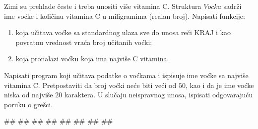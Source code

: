 
\begin{Exercise}[label=struc.2] 
 Zimi su prehlade česte i treba unositi više vitamina C. Struktura
 $Vocka$ sadrži ime voćke i
 količinu vitamina C u miligramima (realan broj). Napisati funkcije:
\begin{enumerate}
  \item {} koja učitava voćke sa standardnog ulaza
     sve do unosa reči KRAJ i kao povratnu vrednost vraća broj učitanih voćki;
  \item {}
     koja pronalazi voćku koja ima najviše C vitamina.
\end{enumerate}
 Napisati program koji učitava podatke o voćkama i ispisuje ime voćke sa najviše vitamina C. 
 Pretpostaviti da broj voćki neće biti veći od $50$, kao i da je ime voćke niska od najviše $20$ karaktera. 
 U slučaju neispravnog unosa, ispisati odgovarajuću poruku o grešci.
 
\begin{maxitest}
\begin{upotreba}{1}
#\naslovInt#
##
##
##
##
##
##
##
\end{upotreba}
\end{maxitest}

\end{Exercise}
\ifresenja
\begin{Answer}[ref=struc.2]
\end{Answer}
\fi


